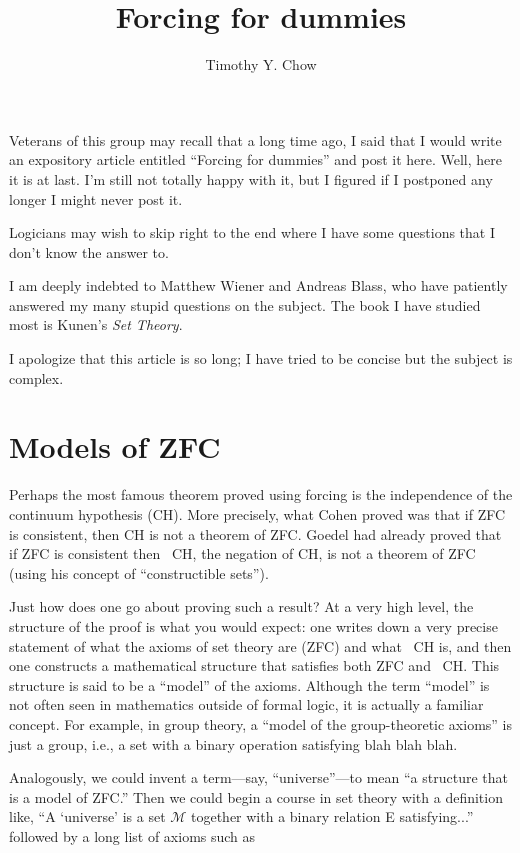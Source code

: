 \documentclass[10pt]{article}
\title{Forcing for dummies}
\author{Timothy Y. Chow}
\date{}
\newcommand\axiom[1]{\textmd{#1}}
\begin{document}
\maketitle


Veterans of this group may recall that a long time ago, I said that I would write an expository article entitled ``Forcing for dummies'' and post it here. Well, here it is at last. I'm still not totally happy with it, but I figured if I postponed any longer I might never post it. 

Logicians may wish to skip right to the end where I have some questions that I don't know the answer to.

I am deeply indebted to Matthew Wiener and Andreas Blass, who have patiently answered my many stupid questions on the subject. The book I have studied most is Kunen's \textit{Set Theory}. 

I apologize that this article is so long; I have tried to be concise but the subject is complex. 


\section{Models of \axiom{ZFC}}

Perhaps the most famous theorem proved using forcing is the independence of the continuum hypothesis (\axiom{CH}). More precisely, what Cohen proved was that if \axiom{ZFC} is consistent, then \axiom{CH} is not a theorem of \axiom{ZFC}. Goedel had already proved that if \axiom{ZFC} is consistent then \axiom{~CH}, the negation of \axiom{CH}, is not a theorem of \axiom{ZFC} (using his concept of ``constructible sets'').

Just how does one go about proving such a result? At a very high level, the structure of the proof is what you would expect: one writes down a very precise statement of what the axioms of set theory are (\axiom{ZFC}) and what \axiom{~CH} is, and then one constructs a mathematical structure that satisfies both \axiom{ZFC} and \axiom{~CH}. This structure is said to be a ``model'' of the axioms. Although the term ``model'' is not often seen in mathematics outside of formal logic, it is actually a familiar concept. For example, in group theory, a ``model of the group-theoretic axioms'' is just a group, i.e., a set with a binary operation satisfying blah blah blah.

Analogously, we could invent a term---say, ``universe''---to mean ``a structure that is a model of \axiom{ZFC}.'' Then we could begin a course in set theory with a definition like, ``A `universe' is a set $\mathcal{M}$ together with a binary relation E satisfying...'' followed by a long list of axioms such as
\end{document}
